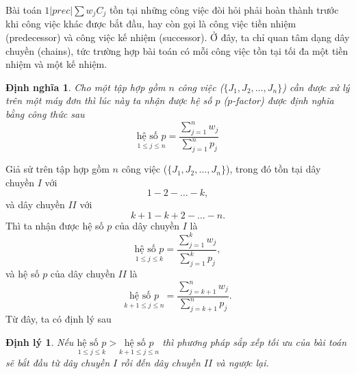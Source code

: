 \documentclass[12pt,a4paper]{report}
\newtheorem{dn}{Định nghĩa}
\newtheorem{dl}{Định lý}
\begin{document}
Bài toán $1|prec|\sum w_j C_j$ tồn tại những công việc đòi hỏi phải hoàn thành trước khi công việc khác được bắt đầu, hay còn gọi là công việc tiền nhiệm (predecessor) và công việc kế nhiệm (successor). Ở đây, ta chỉ quan tâm dạng dây chuyền (chains), tức trường hợp bài toán có mỗi công việc tồn tại tối đa một tiền nhiệm và một kế nhiệm.

\begin{dn}
Cho một tập hợp gồm $n$ công việc ($\{J_1, J_2, …, J_n\}$) cần được xử lý trên một máy đơn thì lúc này ta nhận được hệ số $p$ ($p$-factor) được định nghĩa bằng công thức sau
\begin{equation}
	\underset{1 \leq j \leq n}{\text{hệ số }p} = \frac{\sum_{j=1}^n w_j}{\sum_{j=1}^n p_j}
\end{equation}
\end{dn}

Giả sử trên tập hợp gồm $n$ công việc ($\{J_1, J_2, …, J_n\}$), trong đó tồn tại dây chuyền $I$ với
\begin{equation*}
1 - 2 - \ldots - k,
\end{equation*}
và dây chuyền $II$ với
\begin{equation*}
k+1 - k+2 - \ldots - n.
\end{equation*}
Thì ta nhận được hệ số $p$ của dây chuyền $I$ là
\begin{equation}
	\underset{1 \leq j \leq k}{\text{hệ số }p} = \frac{\sum_{j=1}^k w_j}{\sum_{j=1}^k p_j},
\end{equation}
và hệ số $p$ của dây chuyền $II$ là
\begin{equation}
	\underset{k+1 \leq j \leq n}{\text{hệ số }p} = \frac{\sum_{j=k+1}^n w_j}{\sum_{j=k+1}^n p_j}.
\end{equation}
Từ đây, ta có định lý sau
\begin{dl} \label{daychuyen}
	Nếu $\underset{1 \leq j \leq k}{\text{hệ số }p} > \underset{k+1 \leq j \leq n}{\text{hệ số }p}$ thì phương pháp sắp xếp tối ưu của bài toán sẽ bắt đầu từ dây chuyền $I$ rồi đến dây chuyền $II$ và ngược lại.
\end{dl}
\end{document}
